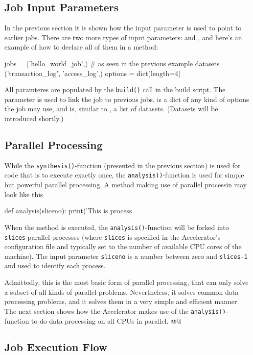 \subsection{Job Input Parameters}
In the previous section it is shown how the input parameter \jobs is
used to point to earlier jobs.  There are two more types of input
parameters: \options and \datasets, and here's an example of how to
declare all of them in a method:
\begin{python}
jobs = ('hello_world_job',)   # as seen in the previous example
datasets = ('transaction_log', 'access_log',)
options = dict(length=4)
\end{python}
All paramteres are populated by the \texttt{build()} call in the build
script.  The \jobs parameter is used to link the job to previous jobs.
\options is a dict of any kind of options the job may use, and
\datasets is, similar to \jobs, a list of datasets.  (Datasets will be
introduced shortly.)


\subsection{Parallel Processing}

While the \texttt{synthesis()}-function (presented in the previous
section) is used for code that is to execute exactly once, the
\texttt{analysis()}-function is used for simple but powerful parallel
processing.  A method making use of parallel processin may look like
this
\begin{python}
def analysis(sliceno):
    print('This is process %
\end{python}
When the method is executed, the \texttt{analysis()}-function will be
forked into \texttt{slices} parallel processes (where
\texttt{slices} is specified in the Accelerator's configuration file
and typically set to the number of available CPU cores of the
machine).  The input parameter \texttt{sliceno} is a number between
zero and \texttt{slices-1} and used to identify each process.

Admittedly, this is the most basic form of parallel processing, that
can only solve a subset of all kinds of parallel problems.
Nevertheless, it solves common data processing problems, and it solves
them in a very simple and efficient manner.  The next section shows
how the Accelerator makes use of the \texttt{analysis()}-function to
do data processing on all CPUs in parallel. @@


\subsection{Job Execution Flow}

